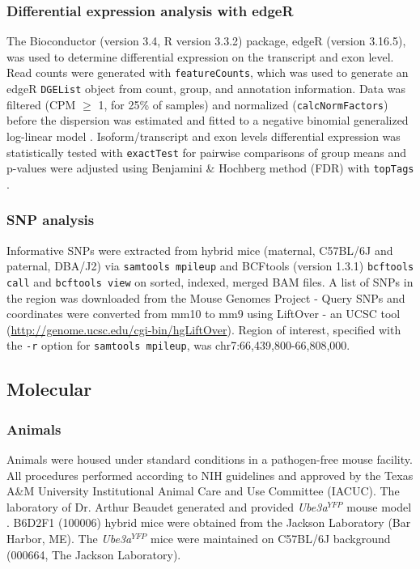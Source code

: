 \subsubsection*{Differential expression analysis with edgeR}
The Bioconductor \cite{Anders2013,Huber2015} (version 3.4, R \cite{Rcite2016} version 3.3.2) package, edgeR \cite{Chen2014,Robinson2009} (version 3.16.5), was used to determine differential expression on the transcript and exon level. Read counts were generated with \texttt{featureCounts}, which was used to generate an edgeR \texttt{DGEList} object from count, group, and annotation information. Data was filtered (CPM $\ge$ 1, for 25\% of samples) and normalized (\texttt{calcNormFactors}) before the dispersion was estimated \cite{Chen2014,Phipson2016} and fitted to a negative binomial generalized log-linear model \cite{McCarthy2012}. Isoform/transcript and exon levels differential expression was statistically tested with \texttt{exactTest} \cite{Robinson2007b} for pairwise comparisons of group means and p-values were adjusted using Benjamini \& Hochberg method (FDR) \cite{BH_1995} with \texttt{topTags} \cite{Robinson2007b,Robinson2007a}.

\subsubsection*{SNP analysis}
Informative SNPs were extracted from hybrid mice (maternal, C57BL/6J and paternal, DBA/J2) via \texttt{samtools mpileup} and BCFtools (version 1.3.1) \texttt{bcftools call} and \texttt{bcftools view} on sorted, indexed, merged BAM files. A list of SNPs in the region was downloaded from the Mouse Genomes Project - Query SNPs \cite{Keane2011,Yalcin2011} and coordinates were converted from mm10 to mm9 using LiftOver - an UCSC tool (\url{http://genome.ucsc.edu/cgi-bin/hgLiftOver}). Region of interest, specified with the \texttt{-r} option for \texttt{samtools mpileup}, was chr7:66,439,800-66,808,000.

\subsection{Molecular}
\subsubsection{Animals}
Animals were housed under standard conditions in a pathogen-free mouse facility. All procedures performed according to NIH guidelines and approved by the Texas A\&M University Institutional Animal Care and Use Committee (IACUC). The laboratory of Dr. Arthur Beaudet generated and provided \textit{Ube3a$^{YFP}$} mouse model \cite{Dindot2008}.  B6D2F1 (100006) hybrid mice were obtained from the Jackson Laboratory (Bar Harbor, ME). The \textit{Ube3a$^{YFP}$} mice were maintained on C57BL/6J background (000664, The Jackson Laboratory).

